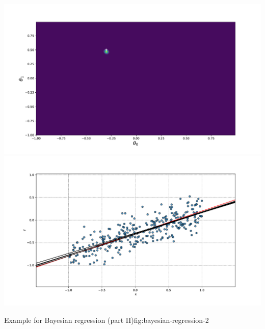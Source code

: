 \begin{frame}
{\begin{minipage}{0.45\textwidth}
			\includegraphics[scale=0.17]{18_advanced_regression/02_img/posterior_300} \\[-2mm]
			\includegraphics[scale=0.17]{18_advanced_regression/02_img/samples_300}
		\end{minipage}
	}{Example for Bayesian regression (part II)}{fig:bayesian-regression-2}
\end{frame}


